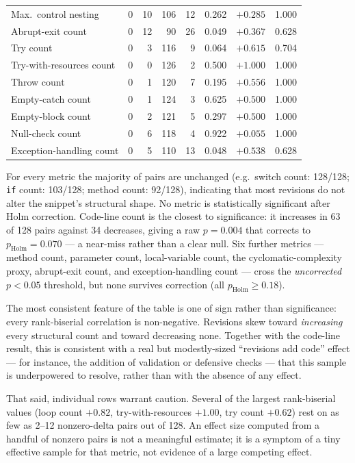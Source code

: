 \begin{table}[htbp]
\begin{tabular}{lrrrrrrr}
Max.\ control nesting        & $0$ & 10 & 106 & 12 & 0.262 & $+0.285$ & 1.000 \\
Abrupt-exit count            & $0$ & 12 & 90  & 26 & 0.049 & $+0.367$ & 0.628 \\
Try count                    & $0$ & 3  & 116 & 9  & 0.064 & $+0.615$ & 0.704 \\
Try-with-resources count     & $0$ & 0  & 126 & 2  & 0.500 & $+1.000$ & 1.000 \\
Throw count                  & $0$ & 1  & 120 & 7  & 0.195 & $+0.556$ & 1.000 \\
Empty-catch count            & $0$ & 1  & 124 & 3  & 0.625 & $+0.500$ & 1.000 \\
Empty-block count            & $0$ & 2  & 121 & 5  & 0.297 & $+0.500$ & 1.000 \\
Null-check count             & $0$ & 6  & 118 & 4  & 0.922 & $+0.055$ & 1.000 \\
Exception-handling count     & $0$ & 5  & 110 & 13 & 0.048 & $+0.538$ & 0.628 \\
\bottomrule
\end{tabular}
\end{table}

For every metric the majority of pairs are unchanged (e.g.\ switch count: 128/128; \texttt{if} count: 103/128; method count: 92/128), indicating that most revisions do not alter the snippet's structural shape.
No metric is statistically significant after Holm correction.
Code-line count is the closest to significance: it increases in 63 of 128 pairs against 34 decreases, giving a raw $p=0.004$ that corrects to $p_{\text{Holm}}=0.070$ --- a near-miss rather than a clear null.
Six further metrics --- method count, parameter count, local-variable count, the cyclomatic-complexity proxy, abrupt-exit count, and exception-handling count --- cross the \emph{uncorrected} $p<0.05$ threshold, but none survives correction (all $p_{\text{Holm}}\geq0.18$).

The most consistent feature of the table is one of sign rather than significance: every rank-biserial correlation is non-negative.
Revisions skew toward \emph{increasing} every structural count and toward decreasing none.
Together with the code-line result, this is consistent with a real but modestly-sized ``revisions add code'' effect --- for instance, the addition of validation or defensive checks --- that this sample is underpowered to resolve, rather than with the absence of any effect.

That said, individual rows warrant caution.
Several of the largest rank-biserial values (loop count $+0.82$, try-with-resources $+1.00$, try count $+0.62$) rest on as few as 2--12 nonzero-delta pairs out of 128.
An effect size computed from a handful of nonzero pairs is not a meaningful estimate; it is a symptom of a tiny effective sample for that metric, not evidence of a large competing effect.

